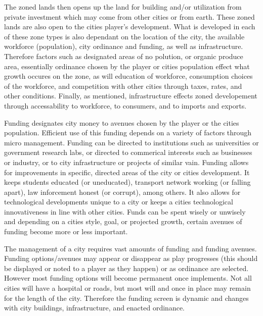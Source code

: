 The zoned lands then opens up the land for building and/or utilization from private investment which may come from other cities or from earth. These zoned lands are also open to the cities player's development. 
What is developed in each of these zone types is also dependant on the location of the city, the available workforce (population), city ordinance and funding, as well as infrastructure. Therefore factors such as designated areas of no polution, or organic produce area, essentially ordinance chosen by the player or cities population effect what growth occures on the zone, as will education of workforce, consumption choices of the workforce, and competition with other cities through taxes, rates, and other conditions. Finally, as mentioned, infrastructure effects zoned developement through accessability to workforce, to consumers, and to imports and exports.




Funding designates city money to avenues chosen by the player or the cities population. Efficient use of this funding depends on a variety of factors through micro management. Funding can be directed to institutions such as universities or government research labs, or directed to commerical interests such as businesses or industry, or to city infrastructure or projects of similar vain. Funding allows for improvements in specific, directed areas of the city or cities development. It keeps students educated (or uneducated), transport network working (or falling apart), law inforcement honest (or corrupt), among others. It also allows for technological developments unique to a city or keeps a cities technological innovativeness in line with other cities. Funds can be spent wisely or unwisely and depending on a cities style, goal, or projected growth, certain avenues of funding become more or less important.

The management of a city requires vast amounts of funding and funding avenues. Funding options/avenues may appear or disappear as play progresses (this should be displayed or noted to a player as they happen) or as ordinance are selected. However most funding options will become permanent once implements. Not all cities will have a hospital or roads, but most will and once in place may remain for the length of the city. Therefore the funding screen is dynamic and changes with city buildings, infrastructure, and enacted ordinance.

